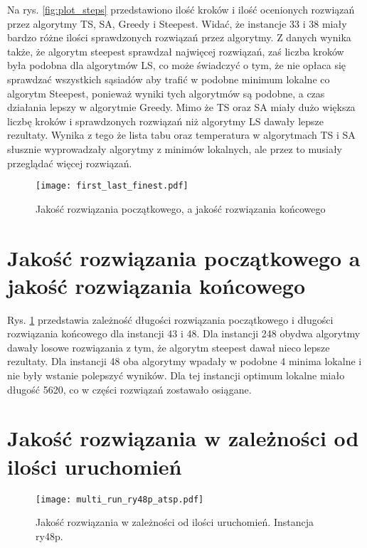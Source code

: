 \documentclass{article}
\begin{document}
Na rys. \ref{fig:plot_steps} przedstawiono ilość kroków i ilość ocenionych rozwiązań przez algorytmy TS, SA, Greedy i Steepest. Widać, że instancje 33 i 38 miały bardzo różne ilości sprawdzonych rozwiązań przez algorytmy. Z danych wynika także, że algorytm steepest sprawdzał najwięcej rozwiązań, zaś liczba kroków była podobna dla algorytmów LS, co może świadczyć o tym, że nie opłaca się sprawdzać wszystkich sąsiadów aby trafić w podobne minimum lokalne co algorytm Steepest, ponieważ wyniki tych algorytmów są podobne, a czas działania lepszy w algorytmie Greedy. Mimo że TS oraz SA miały dużo większa liczbę kroków i sprawdzonych rozwiązań niż algorytmy LS dawały lepsze rezultaty. Wynika z tego że lista tabu oraz temperatura w algorytmach TS i SA słusznie wyprowadzały algorytmy z minimów lokalnych, ale przez to musiały przeglądać więcej rozwiązań.



\begin{figure}[H]
    \begin{center}
        \texttt{[image: first\_last\_finest.pdf]}
    \end{center}
    \caption{Jakość rozwiązania początkowego, a jakość rozwiązania końcowego}
    \label{fig:first_finnest}
\end{figure}


\section{Jakość rozwiązania początkowego a jakość rozwiązania końcowego}

Rys. \ref{fig:first_finnest} przedstawia zależność długości rozwiązania początkowego i długości rozwiązania końcowego dla instancji 43 i 48. Dla instancji 248 obydwa algorytmy dawały losowe rozwiązania z tym, że algorytm steepest dawał nieco lepsze rezultaty. Dla instancji 48 oba algorytmy wpadały w podobne 4 minima lokalne i nie były wstanie polepszyć wyników. Dla tej instancji optimum lokalne miało długość 5620, co w części rozwiązań zostawało osiągane.

\section{Jakość rozwiązania w zależności od ilości uruchomień}

\begin{figure}[H]
    \begin{center}
        \texttt{[image: multi\_run\_ry48p\_atsp.pdf]}
    \end{center}
    \caption{Jakość rozwiązania w zależności od ilości uruchomień. Instancja ry48p.}
    \label{fig:plot_multi_run_ry48p}
\end{figure}
\end{document}
